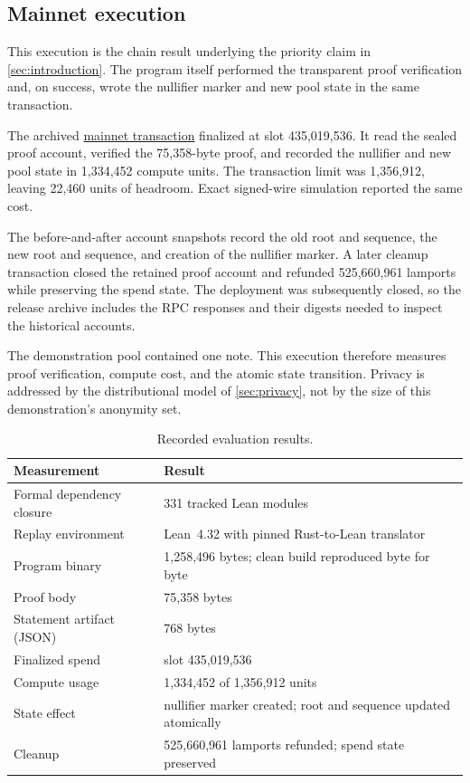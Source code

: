 \subsection{Mainnet execution}

This execution is the chain result underlying the priority claim in
\cref{sec:introduction}.  The program itself performed the transparent proof
verification and, on success, wrote the nullifier marker and new pool state in
the same transaction.

The archived
\href{https://explorer.solana.com/tx/EJviPgF12i9iK2CveVaQSMeFQqDMFPQ1iPRUYEwNQE3zGquTUZNJXPZEENorcQtsnQj1orFmH1TPsgdbR3vJ2fE}
{mainnet transaction} finalized at slot 435,019,536.  It read the sealed proof
account, verified the 75,358-byte proof, and recorded the nullifier and new
pool state in 1,334,452 compute units.  The transaction limit was 1,356,912,
leaving 22,460 units of headroom.  Exact signed-wire simulation reported the
same cost.

The before-and-after account snapshots record the old root and sequence, the
new root and sequence, and creation of the nullifier marker.  A later cleanup
transaction closed the retained proof account and refunded 525,660,961
lamports while preserving the spend state.  The deployment was subsequently
closed, so the release archive includes the RPC responses and their digests
needed to inspect the historical accounts.

The demonstration pool contained one note.  This execution therefore measures
proof verification, compute cost, and the atomic state transition.  Privacy is
addressed by the distributional model of \cref{sec:privacy}, not by the size of
this demonstration's anonymity set.

\begin{table}[t]
\centering
\small
\caption{Recorded evaluation results.}
\label{tab:evaluation-results}
\begin{tabularx}{\textwidth}{@{}R{0.34\textwidth}Y@{}}
\toprule
Measurement & Result \\
\midrule
Formal dependency closure & 331 tracked Lean modules \\
Replay environment & Lean~4.32 with pinned Rust-to-Lean translator \\
Program binary & 1,258,496 bytes; clean build reproduced byte for byte \\
Proof body & 75,358 bytes \\
Statement artifact (JSON) & 768 bytes \\
Finalized spend & slot 435,019,536 \\
Compute usage & 1,334,452 of 1,356,912 units \\
State effect & nullifier marker created; root and sequence updated atomically \\
Cleanup & 525,660,961 lamports refunded; spend state preserved \\
\bottomrule
\end{tabularx}
\end{table}

